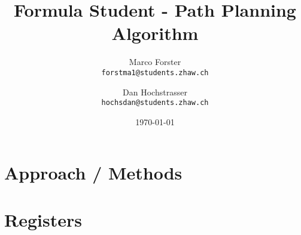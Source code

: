 \documentclass[a4paper, 12pt]{report}
\title{Formula Student - Path Planning Algorithm}
\author{
  Marco Forster\\
  \texttt{forstma1@students.zhaw.ch}
  \and
  Dan Hochstrasser\\
  \texttt{hochsdan@students.zhaw.ch}
}
\date{\today}
\begin{document}
\begin{sloppypar}






  \setcounter{secnumdepth}{3}



  \chapter{Approach / Methods} \label{ch:Approach / Methods}
  



  \chapter{Registers} \label{ch:Registers}
  


\end{sloppypar}
\end{document}

